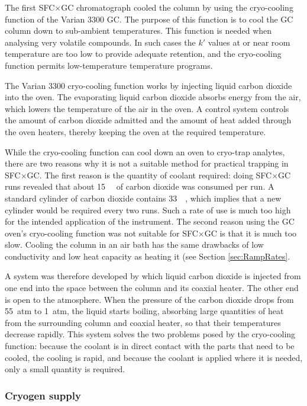 The first SFC×GC chromatograph cooled the column by using the cryo-cooling
function of the Varian 3300 GC. The purpose of this function is to cool the GC
column down to sub-ambient temperatures. This function is needed when analysing
very volatile compounds. In such cases the \(k'\) values at or near room
temperature are too low to provide adequate retention, and the cryo-cooling
function permits low-temperature temperature programs.

The Varian 3300 cryo-cooling function works by injecting liquid carbon dioxide
into the oven. The evaporating liquid carbon dioxide absorbs energy from the
air, which lowers the temperature of the air in the oven. A control system
controls the amount of carbon dioxide admitted and the amount of heat added
through the oven heaters, thereby keeping the oven at the required temperature.

While the cryo-cooling function can cool down an oven to cryo-trap analytes,
there are two reasons why it is not a suitable method for practical trapping in
SFC×GC. The first reason is the quantity of coolant required: doing SFC×GC runs
revealed that about \SI{15}{\kilo\gramme} of carbon dioxide was consumed per
run. A standard cylinder of carbon dioxide contains \SI{33}{\kilo\gramme}, which
implies that a new cylinder would be required every two runs. Such a rate of use
is much too high for the intended application of the instrument. The second
reason using the GC oven's cryo-cooling function was not suitable for SFC×GC is
that it is much too slow. Cooling the column in an air bath has the same
drawbacks of low conductivity and low heat capacity as heating it (see Section
\ref{sec:RampRates}.

A system was therefore developed by which liquid carbon dioxide is injected from
one end into the space between the column and its coaxial heater. The other end
is open to the atmosphere. When the pressure of the carbon dioxide drops from
\SI{55}{atm} to \SI{1}{atm}, the liquid starts boiling, absorbing large
quantities of heat from the surrounding column and coaxial heater, so that their
temperatures decrease rapidly. This system solves the two problems posed by the
cryo-cooling function: because the coolant is in direct contact with the parts
that need to be cooled, the cooling is rapid, and because the coolant is applied
where it is needed, only a small quantity is required.

\subsubsection{Cryogen supply}



